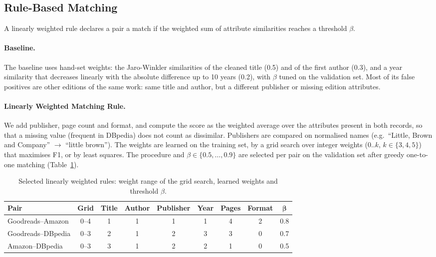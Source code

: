 \documentclass[runningheads]{llncs}
\begin{document}
\subsection{Rule-Based Matching}\label{sec:rules}

A linearly weighted rule declares a pair a match if the weighted sum of attribute
similarities reaches a threshold $\beta$.

\paragraph{Baseline.}
The baseline uses hand-set weights: the Jaro-Winkler similarities of the cleaned
title (0.5) and of the first author (0.3), and a year similarity that decreases
linearly with the absolute difference up to 10 years (0.2), with $\beta$ tuned on
the validation set. Most of its false positives are other editions of the same
work: same title and author, but a different publisher or missing edition
attributes.

\paragraph{Linearly Weighted Matching Rule.}
We add publisher, page count and format, and compute the score as the weighted
average over the attributes present in both records, so that a missing value
(frequent in DBpedia) does not count as dissimilar. Publishers are compared on
normalised names (e.g.\ ``Little, Brown and Company'' $\to$ ``little brown'').
The weights are learned on the training set, by a grid search over integer
weights ($0..k$, $k \in \{3,4,5\}$) that maximises F1, or by least squares. The procedure and $\beta \in \{0.5,\dots,0.9\}$ are selected per pair
on the validation set after greedy one-to-one matching
(Table~\ref{tab:linrule}).

\begin{table}[htbp]
\centering
\caption{Selected linearly weighted rules: weight range of the grid search,
learned weights and threshold $\beta$.}
\label{tab:linrule}
\footnotesize
\setlength{\tabcolsep}{2pt}
\begin{tabular}{lcccccccc}
\toprule
\textbf{Pair} & \textbf{Grid} & \textbf{Title} & \textbf{Author} & \textbf{Publisher} & \textbf{Year} & \textbf{Pages} & \textbf{Format} & $\boldsymbol{\beta}$ \\
\midrule
Goodreads--Amazon  & 0--4 & 1 & 1 & 1 & 1 & 4 & 2 & 0.8 \\
Goodreads--DBpedia & 0--3 & 2 & 1 & 2 & 3 & 3 & 0 & 0.7 \\
Amazon--DBpedia    & 0--3 & 3 & 1 & 2 & 2 & 1 & 0 & 0.5 \\
\bottomrule
\end{tabular}
\end{table}
\end{document}
